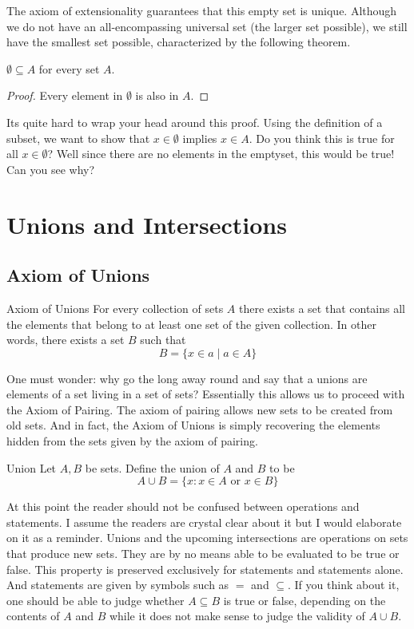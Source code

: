 \documentclass[a4paper]{article}
\begin{document}
The axiom of extensionality guarantees that this empty set is unique. Although we do not have an all-encompassing universal set (the larger set possible), we still have the smallest set possible, characterized by the following theorem. 

\begin{thm}{}{} $\emptyset\subseteq A$ for every set $A$. \tcbline
\begin{proof} Every element in $\emptyset$ is also in $A$. 
\end{proof}
\end{thm}

Its quite hard to wrap your head around this proof. Using the definition of a subset, we want to show that $x\in\emptyset$ implies $x\in A$. Do you think this is true for all $x\in\emptyset$? Well since there are no elements in the emptyset, this would be true! Can you see why?

\pagebreak

\section{Unions and Intersections}
\subsection{Axiom of Unions}
\begin{axm}{Axiom of Unions}{} For every collection of sets $A$ there exists a set that contains all the elements that belong to at least one set of the given collection. In other words, there exists a set $B$ such that $$B=\{x\in a\;|\;a\in A\}$$
\end{axm}

One must wonder: why go the long away round and say that a unions are elements of a set living in a set of sets? Essentially this allows us to proceed with the Axiom of Pairing. The axiom of pairing allows new sets to be created from old sets. And in fact, the Axiom of Unions is simply recovering the elements hidden from the sets given by the axiom of pairing. 

\begin{defn}{Union}{} Let $A,B$ be sets. Define the union of $A$ and $B$ to be $$A\cup B=\{x:x\in A\text{ or }x\in B\}$$
\end{defn}

At this point the reader should not be confused between operations and statements. I assume the readers are crystal clear about it but I would elaborate on it as a reminder. Unions and the upcoming intersections are operations on sets that produce new sets. They are by no means able to be evaluated to be true or false. This property is preserved exclusively for statements and statements alone. And statements are given by symbols such as $=$ and $\subseteq$. If you think about it, one should be able to judge whether $A\subseteq B$ is true or false, depending on the contents of $A$ and $B$ while it does not make sense to judge the validity of $A\cup B$. 
\end{document}
